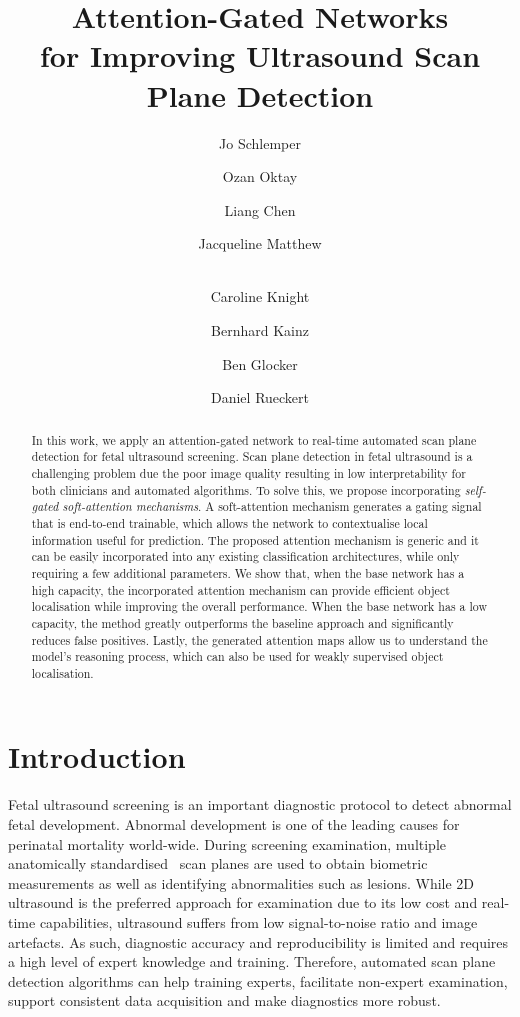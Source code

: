 \documentclass{article}
\title{Attention-Gated Networks\\for Improving Ultrasound Scan Plane Detection}
\author[1]{Jo Schlemper}
\author[1]{Ozan Oktay}
\author[1]{Liang Chen}
\author[2]{Jacqueline Matthew}
\author[2]{\\Caroline Knight}
\author[1]{Bernhard Kainz}
\author[1]{Ben Glocker}
\author[1]{Daniel Rueckert}
\affil[1]{Biomedical Image Analysis Group, Imperial College London, London, UK}
\affil[2]{King's College London, London, UK}
\affil[ ]{\url{jo.schlemper11@imperial.ac.uk}}
\begin{document}
\maketitle

\begin{abstract}
In this work, we apply an attention-gated network to real-time automated scan plane detection for fetal ultrasound screening. Scan plane detection in fetal ultrasound is a challenging problem due the poor image quality resulting in low interpretability for both clinicians and automated algorithms. To solve this, we propose incorporating \emph{self-gated soft-attention mechanisms}. A soft-attention mechanism generates a gating signal that is end-to-end trainable, which allows the network to contextualise local information useful for prediction. The proposed attention mechanism is generic and it can be easily incorporated into any existing classification architectures, while only requiring a few additional parameters. We show that, when the base network has a high capacity, the incorporated attention mechanism can provide efficient object localisation while improving the overall performance. When the base network has a low capacity, the method greatly outperforms the baseline approach and significantly reduces false positives. Lastly, the generated attention maps allow us to understand the model's reasoning process, which can also be used for weakly supervised object localisation.
\end{abstract}

\section{Introduction}

Fetal ultrasound screening is an important diagnostic protocol to detect abnormal fetal development. Abnormal development is one of the leading causes for perinatal mortality world-wide. During screening examination, multiple anatomically standardised~\cite{FASP} scan planes are used to obtain biometric measurements as well as identifying abnormalities such as lesions. While 2D ultrasound is the preferred approach for examination due to its low cost and real-time capabilities, ultrasound suffers from low signal-to-noise ratio and image artefacts. As such, diagnostic accuracy and reproducibility is limited and requires a high level of expert knowledge and training. Therefore, automated scan plane detection algorithms can help training experts, facilitate non-expert examination, support consistent data acquisition and make diagnostics more robust.
\end{document}
